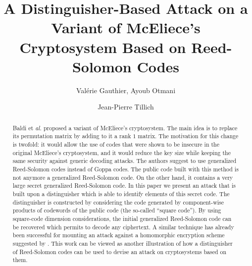 \documentclass[runningheads,11pt]{llncs}
\begin{document}
\title{ A Distinguisher-Based Attack on a Variant of McEliece's
  Cryptosystem Based on Reed-Solomon Codes
} 

\author{Val\'erie Gauthier, Ayoub Otmani \and Jean-Pierre Tillich}

\maketitle
\begin{center}
  \date{}
\end{center}

\begin{abstract}
Baldi et \textit{al.} proposed a variant of McEliece's cryptosystem. The main idea is to 
replace its permutation matrix by adding to it a rank $1$ matrix. 
The motivation for this change is twofold: it would allow the use of codes that were shown to be insecure 
in the original McEliece's cryptosystem, and it would reduce the key size while keeping 
the same security against generic decoding attacks. The authors suggest to use generalized Reed-Solomon 
codes instead of Goppa codes. The public code built with this method is not anymore a generalized Reed-Solomon code. 
On the other hand, it contains a very large secret generalized Reed-Solomon code. 
In this paper we present an attack that is built upon a distinguisher which is able
to identify elements of this secret code.  
The distinguisher is constructed by considering the code generated by component-wise products of codewords of the public code
(the so-called ``square code''). By using square-code dimension considerations, the initial generalized Reed-Solomon code can be
recovered which permits to decode any ciphertext. A similar technique
has already been successful for mounting an attack \cite{GOT:eprint12} against a homomorphic
encryption scheme suggested by \cite{BL12}. This work can be
viewed as another illustration of how a distinguisher of Reed-Solomon
codes can be used to devise an attack on cryptosystems based on them. 
 \end{abstract}
\end{document}

